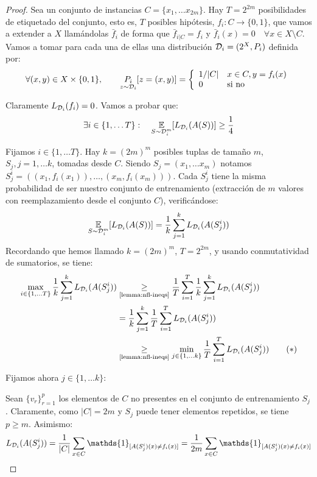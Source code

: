 \begin{proof}
Sea un conjunto de instancias $C=\{x_1, \ldots x_{2m}\}$. Hay $T = 2^{2m}$ posibilidades de etiquetado del conjunto,
esto es, $T$ posibles hipótesis, $f_i: C\rightarrow \{0,1\}$, que vamos a extender a $X$ llamándolas $\bar{f}_i$
de forma que $\bar{f}_{i|C} = f_i$ y $\bar{f}_i(x) = 0 \quad \forall x\in X\setminus C$. 
Vamos a tomar para cada una de ellas una distribución $\mathcal{D}_i=(2^X, P_i)$ definida por:
\[
  \forall (x,y)\in X \times \{0,1\}, \qquad \underset{z\sim \mathcal{D}_i}{P_i} [z = (x,y)] = 
  \left\{\begin{array}{ll}
         1/|C| & x \in C, y=f_i(x)\\
         0     & \textrm{si no}
  \end{array}\right. 
\]

Claramente $L_{\mathcal{D}_i}(f_i) = 0$. Vamos a probar que:
\[
  \exists i\in \{1, \ldots T\} : \quad \underset{S\sim \mathcal{D}_{i}^m}{\mathbb{E}} [L_{\mathcal{D}_i} (A(S))] \ge \frac{1}{4}
\]

Fijamos $i \in \{1, \ldots T\}$. Hay $k = (2m)^m$ posibles tuplas de tamaño $m$, $S_{j}, j=1, \ldots k$, tomadas 
desde $C$. Siendo $S_j = (x_1, \ldots x_m)$ notamos $S_j^i = ((x_1, f_i(x_1)), \ldots, (x_m, f_i(x_m)))$. Cada 
$S_j^i$ tiene la misma probabilidad de ser nuestro conjunto de entrenamiento (extracción de $m$ valores con 
reemplazamiento desde el conjunto $C$), verificándose:
\[
  \underset{S\sim \mathcal{D}_{i}^m}{\mathbb{E}} [L_{\mathcal{D}_i} (A(S))] = \frac{1}{k} \sum_{j=1}^k L_{\mathcal{D}_i} (A(S_j^i))
\]
Recordando que hemos llamado $k=(2m)^m$, $T=2^{2m}$, y usando conmutatividad de sumatorios, se tiene:
\begin{align}
\max_{i \in \{1,\ldots T\}} \frac{1}{k} \sum_{j=1}^{k} L_{\mathcal{D}_i} (A(S_j^i)) &\underset{\textrm{\ref{lemma:nfl-ineqs}}}{\ge }
       \frac{1}{T} \sum_{i=1}^{T} \frac{1}{k} \sum_{j=1}^{k}  L_{\mathcal{D}_i} (A(S_j^i)) \nonumber\\
&=     \frac{1}{k} \sum_{j=1}^{k} \frac{1}{T} \sum_{i=1}^{T}  L_{\mathcal{D}_i} (A(S_j^i)) \nonumber\\
&\underset{\textrm{\ref{lemma:nfl-ineqs}}}{\ge} \min_{j \in \{1, \ldots k\}} \frac{1}{T} \sum_{i=1}^{T}  L_{\mathcal{D}_i} (A(S_j^i)) 
\label{eqn:nfl-ineqs1}\tag{$\ast$}
\end{align}

Fijamos ahora $j \in \{1,\ldots k\}$:

Sean $\{v_r\}_{r=1}^p$ los elementos de $C$ no presentes en el conjunto de entrenamiento $S_j$. 
Claramente, como $|C|=2m$ y $S_j$ puede tener elementos repetidos, se tiene $p \ge m$. Asimismo:
\[
  L_{\dist_i} (A(S^i_j)) = \frac{1}{|C|} \sum_{x\in C} \mathds{1}_{[A(S^i_j)(x) \neq f_i(x)]} = 
  \frac{1}{2m} \sum_{x \in C} \mathds{1}_{[A(S^i_j)(x) \neq f_i(x)]}
\]


\end{proof}
